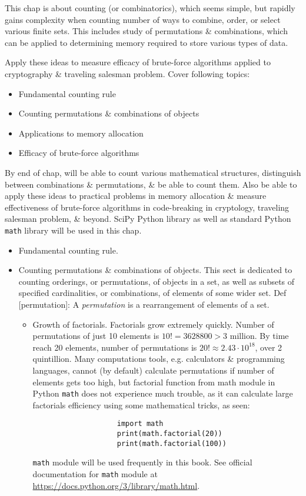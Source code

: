 \documentclass{article}
\begin{document}
\begin{enumerate}
\begin{itemize}
		This chap is about counting (or combinatorics), which seems simple, but rapidly gains complexity when counting number of ways to combine, order, or select various finite sets. This includes study of permutations \& combinations, which can be applied to determining memory required to store various types of data.
		
		Apply these ideas to measure efficacy of brute-force algorithms applied to cryptography \& traveling salesman problem. Cover following topics:
		\begin{itemize}
			\item Fundamental counting rule
			\item Counting permutations \& combinations of objects
			\item Applications to memory allocation
			\item Efficacy of brute-force algorithms
		\end{itemize}
		By end of chap, will be able to count various mathematical structures, distinguish between combinations \& permutations, \& be able to count them. Also be able to apply these ideas to practical problems in memory allocation \& measure effectiveness of brute-force algorithms in code-breaking in cryptology, traveling salesman problem, \& beyond. SciPy Python library as well as standard Python {\tt math} library will be used in this chap.
		\begin{itemize}
			\item {\sf Fundamental counting rule.}
			\item {\sf Counting permutations \& combinations of objects.} This sect is dedicated to counting orderings, or permutations, of objects in a set, as well as subsets of specified cardinalities, or combinations, of elements of some wider set. Def [permutation]: A {\it permutation} is a rearrangement of elements of a set.
			\begin{itemize}
				\item {\sf Growth of factorials.} Factorials grow extremely quickly. Number of permutations of just 10 elements is $10! = 3628800 > 3$ million. By time reach 20 elements, number of permutations is $20!\approx2.43\cdot10^{18}$, over 2 quintillion. Many computations tools, e.g. calculators \& programming languages, cannot (by default) calculate permutations if number of elements gets too high, but factorial function from math module in Python {\tt math} does not experience much trouble, as it can calculate large factorials efficiency using some mathematical tricks, as seen:
				\begin{verbatim}
					import math
					print(math.factorial(20))
					print(math.factorial(100))
				\end{verbatim}
				{\tt math} module will be used frequently in this book. See official documentation for {\tt math} module at \url{https://docs.python.org/3/library/math.html}.
				

\end{itemize}
\end{itemize}
\end{itemize}
\end{enumerate}
\end{document}

